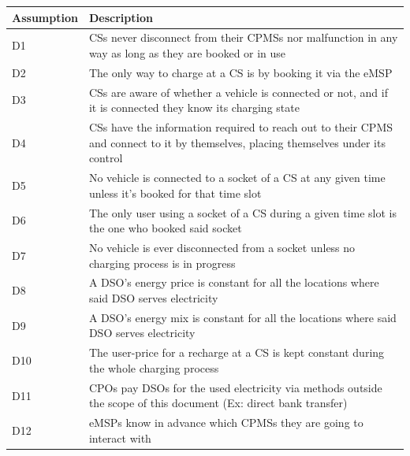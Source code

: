 \documentclass[11pt]{article}
\begin{document}
\begin{table}[H]
    \centering
    \setlength{\tabcolsep}{18pt}
    \renewcommand{\arraystretch}{1.2}
    \begin{tabularx}{\textwidth}{|>{\centering\hsize=0.3\hsize}X|>{\hsize=1.7\hsize}X|}
        \hline
        \textbf{Assumption} & \textbf{Description} \\
        \hline
        D1 & CSs never disconnect from their CPMSs nor malfunction in any way as long as they are booked or in use \\
        \hline
        D2 & The only way to charge at a CS is by booking it via the eMSP \\
        \hline
        D3 & CSs are aware of whether a vehicle is connected or not, and if it is connected they know its charging state \\
        \hline
        D4 & CSs have the information required to reach out to their CPMS and connect to it by themselves, placing themselves under its control \\
        \hline
        D5 & No vehicle is connected to a socket of a CS at any given time unless it's booked for that time slot \\
        \hline
        D6 & The only user using a socket of a CS during a given time slot is the one who booked said socket \\
        \hline
        D7 & No vehicle is ever disconnected from a socket unless no charging process is in progress \\
        \hline
        D8 & A DSO's energy price is constant for all the locations where said DSO serves electricity \\
        \hline
        D9 & A DSO's energy mix is constant for all the locations where said DSO serves electricity \\
        \hline
        D10 & The user-price for a recharge at a CS is kept constant during the whole charging process \\
        \hline
        D11 & CPOs pay DSOs for the used electricity via methods outside the scope of this document (Ex: direct bank transfer) \\
        \hline
        D12 & eMSPs know in advance which CPMSs they are going to interact with \\
        \hline
    \end{tabularx}
    \label{tab:domain_assumptions}
\end{table}
\end{document}
